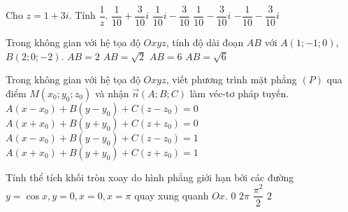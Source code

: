 \begin{ex}%
	Cho $z=1+3i$. Tính $\dfrac{1}{z}$.
	\choice
	{$\dfrac{1}{10}+\dfrac{3}{10}i$}
	{$\dfrac{1}{10}i-\dfrac{3}{10}$}
	{\True $\dfrac{1}{10}-\dfrac{3}{10}i$}
	{$-\dfrac{1}{10}-\dfrac{3}{10}i$}
\end{ex}
\begin{ex}%
	Trong không gian với hệ tọa độ $Oxyz$, tính độ dài đoạn $AB$ với $A\left(1;-1;0\right)$, $B\left(2;0;-2\right)$.
	\choice
	{$AB=2$}
	{$AB=\sqrt{2}$}
	{$AB=6$}
	{\True $AB=\sqrt{6}$}
\end{ex}
\begin{ex}%
	Trong không gian với hệ tọa độ $Oxyz$, viết phương trình mặt phẳng $(P)$ qua điểm $M\left(x_0;y_0;z_0\right)$ và nhận $\vec{n}\left(A;B;C\right)$ làm véc-tơ pháp tuyến.
	\choice
	{\True $A(x-x_0)+B(y-y_0)+C(z-z_0)=0$}
	{$A(x+x_0)+B(y+y_0)+C(z+z_0)=0$}
	{$A(x-x_0)+B(y-y_0)+C(z-z_0)=1$}
	{$A(x+x_0)+B(y+y_0)+C(z+z_0)=1$}
\end{ex}
\begin{ex}%
	Tính thể tích khối tròn xoay do hình phẳng giới hạn bởi các đường $y=\cos x,y=0,x=0,x=\pi $ quay xung quanh $Ox$.
	\choice
	{$0$}
	{$2\pi $}
	{\True $\dfrac{\pi ^2}{2}$}
	{$2$}
\end{ex}
